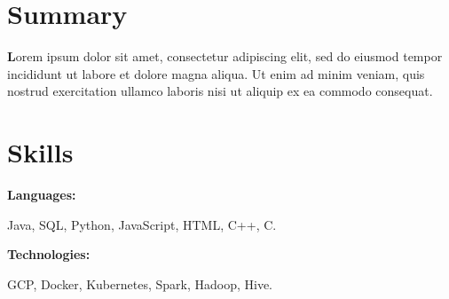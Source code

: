 \documentclass[letterpaper,9pt]{article}
\begin{document}
    \begin{minipage}[t]{0.46\textwidth}
    \section{\textbf{Summary}}
	\textbf Lorem ipsum dolor sit amet, consectetur adipiscing elit, sed do eiusmod tempor incididunt ut labore et dolore magna aliqua. 
    Ut enim ad minim veniam, quis nostrud exercitation ullamco laboris nisi ut aliquip ex ea commodo consequat.  \\
\end{minipage}
\hfill
\begin{minipage}[t]{0.46\textwidth}
\section{\textbf{Skills}}
    
    
    \begin{minipage}[t]{0.2\textwidth}
        \textbf{Languages:}
    \end{minipage}
    \hfill
    \begin{minipage}[t]{0.73\textwidth}
      Java, SQL, Python, JavaScript, HTML, C++, C.  
    \end{minipage}
    \vspace{4mm}
    
    \begin{minipage}[t]{0.2\textwidth}
        \textbf{Technologies:}
    \end{minipage}
    \hfill
    \begin{minipage}[t]{0.73\textwidth}
      GCP, Docker, Kubernetes, Spark, Hadoop, Hive.
    \end{minipage}
    
\end{minipage}
    
\end{document}
